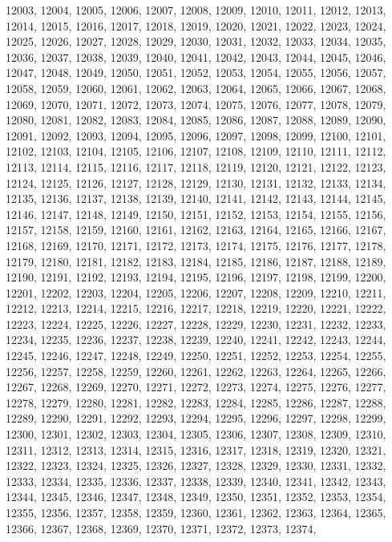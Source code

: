 12003,
12004,
12005,
12006,
12007,
12008,
12009,
12010,
12011,
12012,
12013,
12014,
12015,
12016,
12017,
12018,
12019,
12020,
12021,
12022,
12023,
12024,
12025,
12026,
12027,
12028,
12029,
12030,
12031,
12032,
12033,
12034,
12035,
12036,
12037,
12038,
12039,
12040,
12041,
12042,
12043,
12044,
12045,
12046,
12047,
12048,
12049,
12050,
12051,
12052,
12053,
12054,
12055,
12056,
12057,
12058,
12059,
12060,
12061,
12062,
12063,
12064,
12065,
12066,
12067,
12068,
12069,
12070,
12071,
12072,
12073,
12074,
12075,
12076,
12077,
12078,
12079,
12080,
12081,
12082,
12083,
12084,
12085,
12086,
12087,
12088,
12089,
12090,
12091,
12092,
12093,
12094,
12095,
12096,
12097,
12098,
12099,
12100,
12101,
12102,
12103,
12104,
12105,
12106,
12107,
12108,
12109,
12110,
12111,
12112,
12113,
12114,
12115,
12116,
12117,
12118,
12119,
12120,
12121,
12122,
12123,
12124,
12125,
12126,
12127,
12128,
12129,
12130,
12131,
12132,
12133,
12134,
12135,
12136,
12137,
12138,
12139,
12140,
12141,
12142,
12143,
12144,
12145,
12146,
12147,
12148,
12149,
12150,
12151,
12152,
12153,
12154,
12155,
12156,
12157,
12158,
12159,
12160,
12161,
12162,
12163,
12164,
12165,
12166,
12167,
12168,
12169,
12170,
12171,
12172,
12173,
12174,
12175,
12176,
12177,
12178,
12179,
12180,
12181,
12182,
12183,
12184,
12185,
12186,
12187,
12188,
12189,
12190,
12191,
12192,
12193,
12194,
12195,
12196,
12197,
12198,
12199,
12200,
12201,
12202,
12203,
12204,
12205,
12206,
12207,
12208,
12209,
12210,
12211,
12212,
12213,
12214,
12215,
12216,
12217,
12218,
12219,
12220,
12221,
12222,
12223,
12224,
12225,
12226,
12227,
12228,
12229,
12230,
12231,
12232,
12233,
12234,
12235,
12236,
12237,
12238,
12239,
12240,
12241,
12242,
12243,
12244,
12245,
12246,
12247,
12248,
12249,
12250,
12251,
12252,
12253,
12254,
12255,
12256,
12257,
12258,
12259,
12260,
12261,
12262,
12263,
12264,
12265,
12266,
12267,
12268,
12269,
12270,
12271,
12272,
12273,
12274,
12275,
12276,
12277,
12278,
12279,
12280,
12281,
12282,
12283,
12284,
12285,
12286,
12287,
12288,
12289,
12290,
12291,
12292,
12293,
12294,
12295,
12296,
12297,
12298,
12299,
12300,
12301,
12302,
12303,
12304,
12305,
12306,
12307,
12308,
12309,
12310,
12311,
12312,
12313,
12314,
12315,
12316,
12317,
12318,
12319,
12320,
12321,
12322,
12323,
12324,
12325,
12326,
12327,
12328,
12329,
12330,
12331,
12332,
12333,
12334,
12335,
12336,
12337,
12338,
12339,
12340,
12341,
12342,
12343,
12344,
12345,
12346,
12347,
12348,
12349,
12350,
12351,
12352,
12353,
12354,
12355,
12356,
12357,
12358,
12359,
12360,
12361,
12362,
12363,
12364,
12365,
12366,
12367,
12368,
12369,
12370,
12371,
12372,
12373,
12374,
